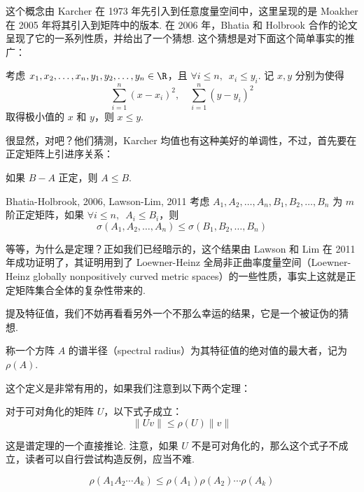 这个概念由 Karcher 在 1973 年先引入到任意度量空间中，这里呈现的是 Moakher 在 2005 年将其引入到矩阵中的版本. 在 2006 年，Bhatia 和 Holbrook 合作的论文呈现了它的一系列性质，并给出了一个猜想. 这个猜想是对下面这个简单事实的推广：

\begin{lemma}{}{}
    考虑 $x_1, x_2, \ldots, x_n, y_1, y_2, \ldots, y_n \in \R$，且 $\forall i \leqslant n,\enspace x_i \leqslant y_i$. 记 $x, y$ 分别为使得
    \[ \sum_{i = 1}^n (x - x_i)^2, \quad \sum_{i = 1}^n (y - y_i)^2 \]
    取得极小值的 $x$ 和 $y$，则 $x \leqslant y$.
\end{lemma}

很显然，对吧？他们猜测，Karcher 均值也有这种美好的单调性，不过，首先要在正定矩阵上引进序关系：

\begin{definition}{}{}
    如果 $B - A$ 正定，则 $A \leqslant B$.
\end{definition}

\begin{theorem}{Bhatia-Holbrook, 2006, Lawson-Lim, 2011}{}
    考虑 $A_1, A_2, \ldots, A_n, B_1, B_2, \ldots, B_n$ 为 $m$ 阶正定矩阵，如果 $\forall i \leqslant n,\enspace A_i \leqslant B_i$，则
    \[ \sigma(A_1, A_2, \ldots, A_n) \leqslant \sigma(B_1, B_2, \ldots, B_n) \]
\end{theorem}

等等，为什么是定理？正如我们已经暗示的，这个结果由 Lawson 和 Lim 在 2011 年成功证明了，其证明用到了 Loewner-Heinz 全局非正曲率度量空间（Loewner-Heinz globally nonpositively curved metric spaces）的一些性质，事实上这就是正定矩阵集合全体的复杂性带来的.

提及特征值，我们不妨再看看另外一个不那么幸运的结果，它是一个被证伪的猜想.

\begin{definition}{}{}
    称一个方阵 $A$ 的谱半径（spectral radius）为其特征值的绝对值的最大者，记为 $\rho(A)$.
\end{definition}

这个定义是非常有用的，如果我们注意到以下两个定理：

\begin{theorem}{}{}
    对于可对角化的矩阵 $U$，以下式子成立：
    \[ \lVert Uv \rVert \leqslant \rho(U) \lVert v \rVert \]
\end{theorem}

这是谱定理的一个直接推论. 注意，如果 $U$ 不是可对角化的，那么这个式子不成立，读者可以自行尝试构造反例，应当不难.

\begin{theorem}{}{}
    \[ \rho(A_1A_2\cdots A_k) \leqslant \rho(A_1)\rho(A_2)\cdots \rho(A_k) \]
\end{theorem}

